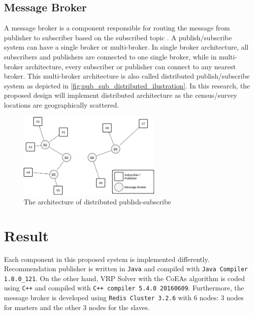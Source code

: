 \documentclass[conference]{IEEEtran}
\begin{document}
\subsection{Message Broker}
\label{ssec:message-broker}
A message broker is a component responsible for routing the message from publisher to subscriber based on the subscribed topic \cite{banavar_efficient_1999}. A publish/subscribe system can have a single broker or multi-broker. In single broker architecture, all subscribers and publishers are connected to one single broker, while in multi-broker architecture, every subscriber or publisher can connect to any nearest broker. This multi-broker architecture is also called distributed publish/subscribe system \cite{muhl_large-scale_2002} as depicted in \autoref{fig:pub_sub_distributed_ilustration}. In this research, the proposed design will implement distributed architecture as the census/survey locations are geographically scattered. 


\begin{figure}[!]
	\centering
	\includegraphics[width=7cm]{Resources/Images/pub_sub_distributed_ilustration}
	\caption{The architecture of distributed publish-subscribe}
	\label{fig:pub_sub_distributed_ilustration}
\end{figure}


\section{Result}
\label{sec:testing}
Each component in this proposed system is implemented differently. Recommendation publisher is written in \verb!Java! and compiled with \verb!Java Compiler 1.8.0_121!. On the other hand, VRP Solver with the CoEAs algorithm is coded using \verb!C++! and compiled with \verb!C++ compiler 5.4.0 20160609!. Furthermore, the message broker is developed using \verb|Redis Cluster 3.2.6| with 6 nodes: 3 nodes for masters and the other 3 nodes for the slaves. 
\end{document}
